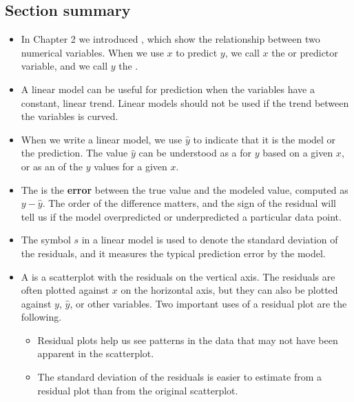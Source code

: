 \subsection*{Section summary}
\begin{itemize}

\item In Chapter 2 we introduced , which show the relationship between two numerical variables.  When we use $x$ to predict $y$, we call $x$ the  or predictor variable, and we call $y$ the .

\item A linear model can be useful for prediction when the variables have a constant, linear trend.  Linear models should not be used if the trend between the variables is curved.  

\item When we write a linear model, we use $\hat{y}$ to indicate that it is the model or the prediction.   The value $\hat{y}$ can be understood as a  for $y$ based on a given $x$, or as an  of the $y$ values for a given $x$.

\item The  is the \textbf{error} between the true value and the modeled value, computed as $y - \hat{y}$.  The order of the difference matters, and the sign of the residual will tell us if the model overpredicted or underpredicted a particular data point.

\item The symbol $s$ in a linear model is used to denote the standard deviation of the residuals, and it measures the typical prediction error by the model.

\item A  is a scatterplot with the residuals on the vertical axis.  The residuals are often plotted against $x$ on the horizontal axis, but they can also be plotted against $y$, $\hat{y}$, or other variables.  Two important uses of a residual plot are the following.
\begin{itemize}
\item Residual plots help us see patterns in the data that may not have been apparent in the scatterplot.
\item The standard deviation of the residuals is easier to estimate from a residual plot than from the original scatterplot.
\end{itemize}


\end{itemize}

